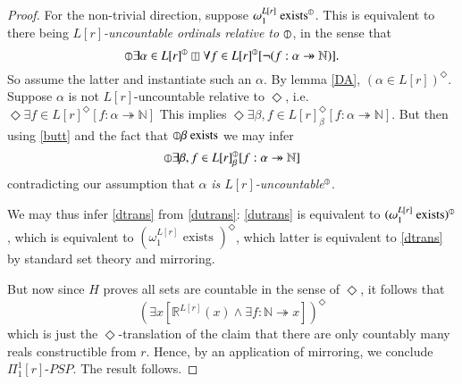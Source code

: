\documentclass{article}
\newcommand\D{\circledbar}
\newcommand\B{\boxbar}
\begin{document}
\begin{proof}
For the non-trivial direction, suppose $\omega_1^{L[r]} \text{ exists}^{\D}$. 
This is equivalent to there being \emph{$L[r]$-uncountable ordinals relative to $\D$}, in the sense that
\[\D \exists \alpha \in L[r]^{\D} \B \forall f \in L[r]^{\D}[\neg(f : \alpha \twoheadrightarrow \mathbb{N})].\]
So assume the latter and instantiate such an $\alpha$. 
By lemma \ref{DA}, $(\alpha \in L[r])^\Diamond$. Suppose $\alpha$ is not
$L[r]$-uncountable relative to $\Diamond$, i.e. 
$\Diamond \exists f \in L[r]^\Diamond[f : \alpha \twoheadrightarrow \mathbb{N}]$
This implies 
$\Diamond \exists \beta, f \in L[r]_\beta^\Diamond[f : \alpha \twoheadrightarrow \mathbb{N}]$. 
But then using \eqref{butt} and the fact that $\D \beta \text{ exists}$ we may infer
\[\D \exists \beta, f \in L[r]_\beta^{\D}[f : \alpha \twoheadrightarrow \mathbb{N}]\]
contradicting our assumption that $\alpha$ \emph{is $L[r]$-uncountable}$^{\D}$.

We may thus infer \eqref{dtrans} from \eqref{dutrans}: \eqref{dutrans} is equivalent to 
$(\omega_1^{L[r]} \text{ exists})^{\D}$, which is equivalent to 
$(\omega_1^{L[r]} \text{ exists })^\Diamond$,
which latter is equivalent to \eqref{dtrans} by standard set theory and mirroring. 

But now since $H$ proves all sets are countable in the sense of $\Diamond$, it follows that 
\begin{equation}
    (\exists x[\mathbb{R}^{L[r]}(x) \wedge \exists f : \mathbb{N} \twoheadrightarrow x])^\Diamond
\end{equation}
which is just the $\Diamond$-translation of the claim that there are only countably many 
reals constructible from $r$. Hence, by an application of mirroring, we conclude $\Pi_1^1[r]$-$PSP$.
The result follows.

\end{proof}


\end{document}
